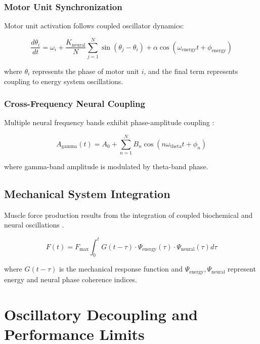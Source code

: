 \documentclass[twocolumn]{article}
\begin{document}
\subsubsection{Motor Unit Synchronization}

Motor unit activation follows coupled oscillator dynamics:

\begin{equation}
\frac{d\theta_i}{dt} = \omega_i + \frac{K_{\text{neural}}}{N}\sum_{j=1}^{N} \sin(\theta_j - \theta_i) + \alpha \cos(\omega_{\text{energy}}t + \phi_{\text{energy}})
\label{eq:motor_unit_coupling}
\end{equation}

where $\theta_i$ represents the phase of motor unit $i$, and the final term represents coupling to energy system oscillations.

\subsubsection{Cross-Frequency Neural Coupling}

Multiple neural frequency bands exhibit phase-amplitude coupling \citep{tort2010measuring}:

\begin{equation}
A_{\text{gamma}}(t) = A_0 + \sum_{n=1}^{N} B_n \cos(n\omega_{\text{theta}}t + \phi_n)
\label{eq:cross_freq_coupling}
\end{equation}

where gamma-band amplitude is modulated by theta-band phase.

\subsection{Mechanical System Integration}

Muscle force production results from the integration of coupled biochemical and neural oscillations \citep{keener2009mathematical}.

\begin{equation}
F(t) = F_{\max} \int_0^t G(t-\tau) \cdot \Psi_{\text{energy}}(\tau) \cdot \Psi_{\text{neural}}(\tau) d\tau
\label{eq:force_integration}
\end{equation}

where $G(t-\tau)$ is the mechanical response function and $\Psi_{\text{energy}}, \Psi_{\text{neural}}$ represent energy and neural phase coherence indices.

\section{Oscillatory Decoupling and Performance Limits}
\end{document}

